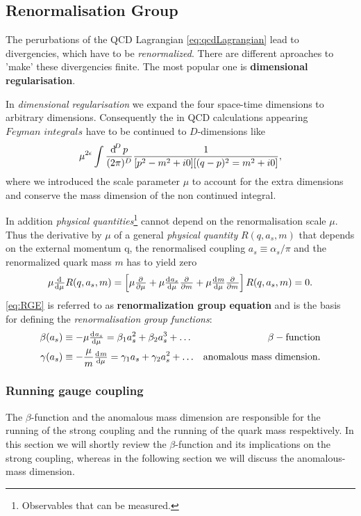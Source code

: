 \documentclass[../../index.tex]{subfiles}
\begin{document}
\subsection{Renormalisation Group}
The perurbations of the QCD Lagrangian \ref{eq:qcdLagrangian} lead to divergencies, which have to be
\textit{renormalized}. There are different aproaches to 'make' these
divergencies finite. The most popular one is \textbf{dimensional
  regularisation}.

In \textit{dimensional regularisation} we expand the four space-time dimensions
to arbitrary dimensions. Consequently the in QCD calculations appearing
$\textit{Feyman integrals}$ have to be continued to $D$-dimensions like
\begin{equation}
  \label{eq:dimRegFeynmanIntegral}
  \mu^{2\epsilon} \int \frac{\dif^D p}{(2\pi)^D}\frac{1}{[p^2-m^2+i0][(q-p)^2=m^2+i0]},
\end{equation}
where we introduced the scale parameter $\mu$ to account for the extra
dimensions and conserve the mass dimension of the non continued integral.

In addition \textit{physical quantities}\footnote{Observables that can be
  measured.} cannot depend on the renormalisation scale $\mu$. Thus the
derivative by $\mu$ of a general \textit{physical quantity} $R(q, a_s, m)$ that depends on the
external momentum q, the renormalised coupling $a_s\equiv\alpha_s/\pi$ and the
renormalized quark mass $m$ has to yield zero
\begin{equation}
  \label{eq:RGE}
  \mu \od{}{\mu}R(q, a_s, m) = \left[ \mu \pd{}{\mu} + \mu \od{a_s}{\mu} \pd{}{m} + \mu \od{m}{\mu} \pd{}{m} \right] R(q, a_s, m) = 0.
\end{equation}
\cref{eq:RGE} is referred to as \textbf{renormalization group equation} and
is the basis for defining the \textit{renormalisation group functions}:
\begin{align}
  \beta(a_s) &\equiv -\mu \od{a_s}{\mu} = \beta_1 a_s^2 + \beta_2 a_s^3 + \dots & \beta-\text{function}
  \label{eq:betaFunction} \\
  \gamma(a_s) &\equiv - \frac{\mu}{m} \od{m}{\mu} = \gamma_1 a_s + \gamma_2 a_s^2 + \dots & \text{anomalous mass dimension}.
  \label{eq:anomalousMassDimension}
\end{align}

\subsubsection{Running gauge coupling}
The $\beta$-function and the anomalous mass dimension are responsible for the
running of the strong coupling and the running of the quark mass respektively.
In this section we will shortly review the $\beta$-function and its implications
on the strong coupling, whereas in the following section we will discuss the
anomalous-mass dimension.
\end{document}

